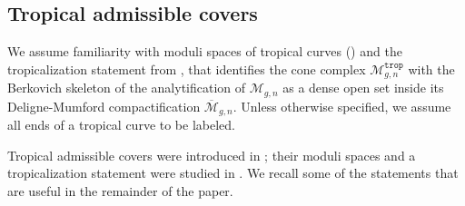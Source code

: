 \documentclass[11pt,reqno]{amsart}
\theoremstyle{definition}
\newcommand{\calM}{\mathcal{M}}
\newcommand{\Mbar}{\overline{\calM}}
\newcommand\trop{{\mathtt{trop}}}
\newcommand\Mgn[1]{\mathcal M_{#1}}
\newcommand\Mgnbar[1]{\Mbar_{#1}}
\begin{document}
\subsection{Tropical admissible covers} \label{sec:tac}
We assume familiarity with moduli spaces of tropical curves (\cite{MikhalkinModuli,m:survey}) and the tropicalization statement from \cite{ACP},  that identifies the cone complex $\Mgn{g,n}^\trop$ with the Berkovich skeleton of the analytification of $\Mgn{g,n}$ as a dense open set inside its Deligne-Mumford compactification $\Mgnbar{g,n}$. Unless otherwise specified, we assume all ends of a tropical curve to be labeled.

Tropical admissible covers were introduced in \cite{Caporaso}; their moduli spaces and a tropicalization statement were studied in \cite{CMRadmissible}. We recall some of the statements that are useful in the remainder of the paper.
\end{document}
